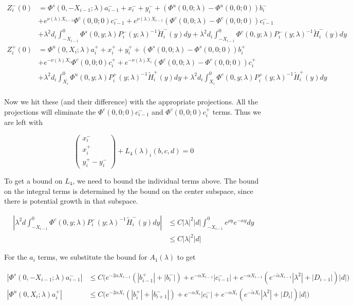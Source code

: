 \documentclass[12pt]{article}
\begin{document}
\begin{align*}
Z_i^-(0) &= \Phi^s(0, -X_{i-1}; \lambda) a_{i-1}^- + x_i^- + y_i^- + (\Phi^u(0, 0; \lambda) - \Phi^u(0, 0; 0))b_i^- \\
&+ e^{\nu(\lambda) X_{i-1}} \Phi^c(0, 0; 0) c_{i-1}^- + e^{\nu(\lambda) X_{i-1}} (\Phi^c(0, 0; 
\lambda) - \Phi^c(0, 0; 0))c_{i-1}^- \\
&+ \lambda^2 d_i \int_{-X_{i-1}}^0 \Phi^s(0, y; \lambda) P_i^-(y; \lambda)^{-1} \tilde{H}_i^-(y) dy 
+ \lambda^2 d_i \int_{-X_{i-1}}^0 \Phi^c(0, y; \lambda) P_i^-(y; \lambda)^{-1} \tilde{H}_i^-(y) dy  \\ 
Z_i^+(0) &= \Phi^u(0, X_i; \lambda) a_i^+ + x_i^+ + y_i^+ + (\Phi^s(0, 0; \lambda) - \Phi^s(0, 0; 0)) b_i^+ \\
&+ e^{-\nu(\lambda)X_i} \Phi^c(0, 0; 0) c_i^+ + e^{-\nu(\lambda)X_i} (\Phi^c(0, 0; \lambda) - \Phi^c(0, 0; 0))c_i^+ \\
&+ \lambda^2 d_i \int_{X_i}^0 \Phi^u(0, y; \lambda) P_i^+(y; \lambda)^{-1} \tilde{H}_i^+(y) dy 
+ \lambda^2 d_i \int_{X_i}^0 \Phi^c(0, y; \lambda) P_i^+(y; \lambda)^{-1} \tilde{H}_i^+(y) dy \\
\end{align*}

Now we hit these (and their difference) with the appropriate projections. All the projections will eliminate the $\Phi^c(0, 0; 0) c_{i-1}^-$ and $\Phi^c(0, 0; 0) c_i^+$ terms. Thus we are left with 

\[
\begin{pmatrix}x_i^- \\ x_i^+ \\ 
y_i^+ - y_i^- \end{pmatrix} + L_4(\lambda)_i(b, c, d) = 0
\]

To get a bound on $L_4$, we need to bound the individual terms above. The bound on the integral terms is determined by the bound on the center subspace, since there is potential growth in that subspace.

\begin{align*}
\left| \lambda^2 d \int_{-X_{i-1}}^0 \Phi^c(0, y; \lambda) P_i^-(y; \lambda)^{-1} \tilde{H}_i^-(y) dy \right| &\leq C |\lambda|^2 |d| \int_{-X_{i-1}}^0 e^{\rho y} e^{-\alpha y} dy \\
&\leq C |\lambda|^2 |d|
\end{align*}

For the $a_i$ terms, we substitute the bound for $A_1(\lambda)$ to get

\begin{align*}
|\Phi^s(0, -X_{i-1}; \lambda) a_{i-1}^-|
&\leq C \Big( e^{-2 \alpha X_{i-1}} (|b_{i-1}^+| + |b_i^-|) + e^{-\alpha X_{i-1}}|c_{i-1}^-| + e^{-\alpha X_{i-1}}(e^{-\tilde{\alpha} X_{i-1}} |\lambda^2| + |D_{i-1}|)|d| \Big) \\
|\Phi^u(0, X_i; \lambda) a_i^+|
&\leq C \Big( e^{-2 \alpha X_i} (|b_i^+| + |b_{i+1}^-|) + e^{-\alpha X_i} |c_i^-| + e^{-\alpha X_i} (e^{-\tilde{\alpha} X_i} |\lambda^2| + |D_i|)|d| \Big)
\end{align*}
\end{document}
